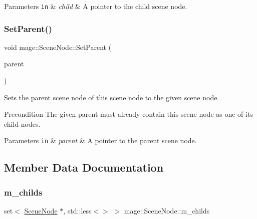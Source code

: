 \begin{DoxyParams}[1]{Parameters}
\mbox{\tt in}  & {\em child} & A pointer to the child scene node. \\
\hline
\end{DoxyParams}
\hypertarget{classmage_1_1_scene_node_a27d5219ff4c1f2b1c37899456af518ae}{}\label{classmage_1_1_scene_node_a27d5219ff4c1f2b1c37899456af518ae} 
\subsubsection{\texorpdfstring{Set\+Parent()}{SetParent()}}
{\footnotesize\ttfamily void mage\+::\+Scene\+Node\+::\+Set\+Parent (\begin{DoxyParamCaption}\item[{\hyperlink{classmage_1_1_scene_node}{Scene\+Node} $\ast$}]{parent }\end{DoxyParamCaption})\hspace{0.3cm}{\ttfamily [private]}}

Sets the parent scene node of this scene node to the given scene node.

\begin{DoxyPrecond}{Precondition}
The given parent must already contain this scene node as one of its child nodes. 
\end{DoxyPrecond}

\begin{DoxyParams}[1]{Parameters}
\mbox{\tt in}  & {\em parent} & A pointer to the parent scene node. \\
\hline
\end{DoxyParams}


\subsection{Member Data Documentation}
\hypertarget{classmage_1_1_scene_node_afd031fb3c5ae4cef203fe8c85be0187e}{}\label{classmage_1_1_scene_node_afd031fb3c5ae4cef203fe8c85be0187e} 
\subsubsection{\texorpdfstring{m\+\_\+childs}{m\_childs}}
{\footnotesize\ttfamily set$<$ \hyperlink{classmage_1_1_scene_node}{Scene\+Node} $\ast$, std\+::less$<$$>$ $>$ mage\+::\+Scene\+Node\+::m\+\_\+childs\hspace{0.3cm}{\ttfamily [private]}}

